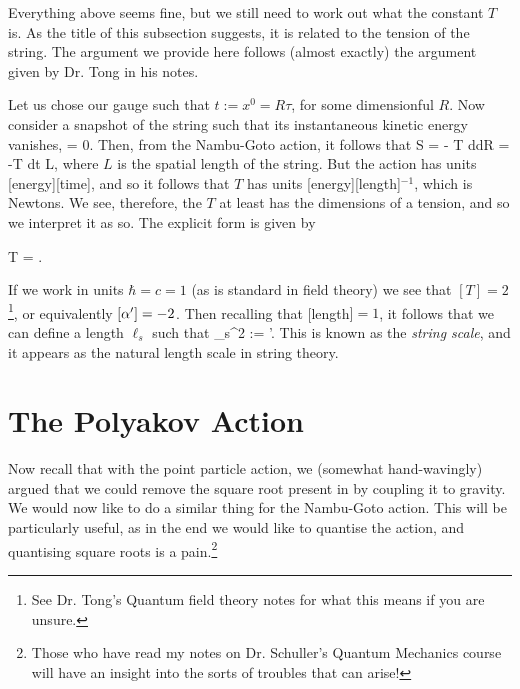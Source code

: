 Everything above seems fine, but we still need to work out what the constant $T$ is. As the title of this subsection suggests, it is related to the tension of the string. The argument we provide here follows (almost exactly) the argument given by Dr. Tong in his notes. 

Let us chose our gauge such that $t:= x^0=R\tau$, for some dimensionful $R$. Now consider a snapshot of the string such that its instantaneous kinetic energy vanishes, 
\bse 
     = 0.
\ese 
Then, from the Nambu-Goto action, it follows that 
\bse
    S = - T \int d\sig d\tau R  = -T \int dt L,
\ese 
where $L$ is the spatial length of the string. But the action has units [energy][time], and so it follows that $T$ has units [energy][length]$^{-1}$, which is Newtons. We see, therefore, the $T$ at least has the dimensions of a tension, and so we interpret it as so. The explicit form is given by

\bse 
    T = .
\ese 

If we work in units $\hbar = c = 1$ (as is standard in field theory) we see that $[T]=2$\footnote{See Dr. Tong's Quantum field theory notes for what this means if you are unsure.}, or equivalently $[\alpha']=-2$. Then recalling that [length$]=1$, it follows that we can define a length $\ell_s$ such that 
\be
\label{eqn:StringScale}
    \ell_s^2 := \a'.
\ee  
This is known as the \textit{string scale}, and it appears as the natural length scale in string theory. 

\section{The Polyakov Action}

Now recall that with the point particle action, we (somewhat hand-wavingly) argued that we could remove the square root present in  by coupling it to gravity. We would now like to do a similar thing for the Nambu-Goto action. This will be particularly useful, as in the end we would like to quantise the action, and quantising square roots is a pain.\footnote{Those who have read my notes on Dr. Schuller's Quantum Mechanics course will have an insight into the sorts of troubles that can arise!}


